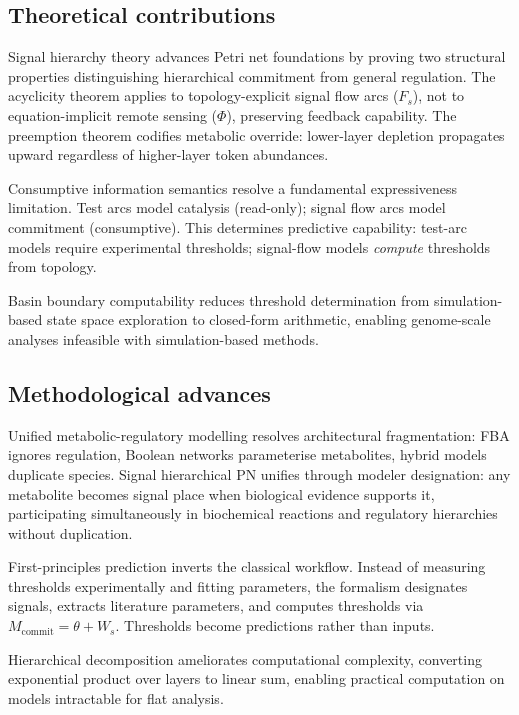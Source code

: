 \documentclass[11pt,a4paper]{article}
\theoremstyle{plain}
\theoremstyle{definition}
\begin{document}
\subsection{Theoretical contributions}

Signal hierarchy theory advances Petri net foundations by proving two structural properties distinguishing hierarchical commitment from general regulation. The acyclicity theorem applies to topology-explicit signal flow arcs ($F_s$), not to equation-implicit remote sensing ($\Phi$), preserving feedback capability. The preemption theorem codifies metabolic override: lower-layer depletion propagates upward regardless of higher-layer token abundances.

Consumptive information semantics resolve a fundamental expressiveness limitation. Test arcs model catalysis (read-only); signal flow arcs model commitment (consumptive). This determines predictive capability: test-arc models require experimental thresholds; signal-flow models \emph{compute} thresholds from topology.

Basin boundary computability reduces threshold determination from simulation-based state space exploration to closed-form arithmetic, enabling genome-scale analyses infeasible with simulation-based methods.

\subsection{Methodological advances}

Unified metabolic-regulatory modelling resolves architectural fragmentation: FBA ignores regulation, Boolean networks parameterise metabolites, hybrid models duplicate species. Signal hierarchical PN unifies through modeler designation: any metabolite becomes signal place when biological evidence supports it, participating simultaneously in biochemical reactions and regulatory hierarchies without duplication.

First-principles prediction inverts the classical workflow. Instead of measuring thresholds experimentally and fitting parameters, the formalism designates signals, extracts literature parameters, and computes thresholds via $M_{\mathrm{commit}} = \theta + W_s$. Thresholds become predictions rather than inputs.

Hierarchical decomposition ameliorates computational complexity, converting exponential product over layers to linear sum, enabling practical computation on models intractable for flat analysis.
\end{document}
